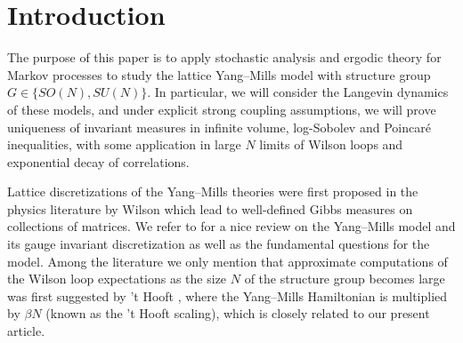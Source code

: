 \documentclass[11pt,UTF-8,reqno]{amsart}
\numberwithin{equation}{section}
\begin{document}
\begin{abstract}
We develop a new stochastic analysis approach to 
 the lattice Yang--Mills model at strong coupling in any dimension $d>1$,
 with t' Hooft scaling $\beta N$ for the inverse coupling strength.
We study their Langevin dynamics, ergodicity, functional inequalities, large $N$ limits, and mass gap.


Assuming  $|\beta| < \frac{N-2}{32(d-1)N}$
for the structure group  $SO(N)$, or  $|\beta| < \frac{1}{16(d-1)}$ for $SU(N)$,
we prove the following results.
The invariant measure for the corresponding Langevin dynamic
is unique on the entire lattice, and the dynamic is exponentially ergodic under a Wasserstein distance.
The finite volume Yang--Mills measures converge to this unique invariant measure in the infinite volume limit, for which
Log-Sobolev and Poincar\'e inequalities hold.
These functional inequalities imply that the suitably rescaled Wilson loops for the infinite volume measure
has factorized correlations and
converges in probability to deterministic limits in the large $N$ limit,
and correlations of a large class of observables
decay exponentially, namely the  infinite volume measure  has a strictly positive mass gap. Our method improves earlier results or simplifies the proofs, and provides some new perspectives to the study of lattice Yang--Mills model. 
\end{abstract}

\setcounter{tocdepth}{2}
\tableofcontents


\section{Introduction}

The purpose of this paper is to apply stochastic analysis  and ergodic theory for Markov processes
to study the lattice Yang--Mills model with structure group $G\in \{SO(N), SU(N) \}$. 
In particular, we will consider the Langevin dynamics of these models,
and under explicit strong coupling  assumptions,
we will prove uniqueness of invariant measures in  infinite volume,
log-Sobolev and Poincar\'e inequalities, with some application in
large $N$ limits of Wilson loops and exponential decay of correlations.

Lattice discretizations of the Yang--Mills theories were first 
 proposed in the physics literature  by Wilson  \cite{Wilson1974}
which lead to well-defined Gibbs measures on collections of matrices.
We refer to \cite{Chatterjee18} for a nice review on the Yang--Mills model
and its gauge invariant discretization as well as the fundamental questions for the model. Among the literature we only mention that 
approximate computations of the Wilson loop expectations  as the size $N$ of the structure group becomes large was first suggested by 't Hooft \cite{tHooft1974}, where the Yang--Mills Hamiltonian is multiplied by $\beta N$ (known as the 't Hooft scaling), which is closely related to our present article.
\end{document}
